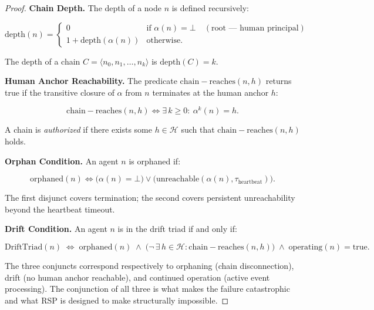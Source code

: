 \begin{proof}
\medskip
\noindent\textbf{Chain Depth.}
The depth of a node $n$ is defined recursively:

\begin{equation}
\mathrm{depth}(n) = 
\begin{cases}
0 & \text{if } \alpha(n) = \bot \quad (\text{root — human principal}) \\
1 + \mathrm{depth}(\alpha(n)) & \text{otherwise}.
\end{cases}
\label{eq:rs-depth}
\end{equation}

The depth of a chain $C = \langle n_0, n_1, \ldots, n_k \rangle$ is $\mathrm{depth}(C) = k$.

\medskip
\noindent\textbf{Human Anchor Reachability.}
The predicate $\mathrm{chain-reaches}(n, h)$ returns true if the transitive closure of $\alpha$ from $n$ terminates at the human anchor $h$:

\begin{equation}
\mathrm{chain-reaches}(n, h) \iff \exists\, k \geq 0:\ \alpha^{k}(n) = h.
\label{eq:rs-chain-reaches}
\end{equation}

A chain is \emph{authorized} if there exists some $h \in \mathcal{H}$ such that $\mathrm{chain-reaches}(n, h)$ holds.

\medskip
\noindent\textbf{Orphan Condition.}
An agent $n$ is orphaned if:

\begin{equation}
\mathrm{orphaned}(n) \iff \bigl( \alpha(n) = \bot \bigr) \lor \bigl( \mathrm{unreachable}(\alpha(n), \tau_{\mathrm{heartbeat}}) \bigr).
\label{eq:rs-orphaned}
\end{equation}

The first disjunct covers termination; the second covers persistent unreachability beyond the heartbeat timeout.

\medskip
\noindent\textbf{Drift Condition.}
An agent $n$ is in the drift triad if and only if:

\begin{equation}
\mathrm{DriftTriad}(n) \;\iff\; \mathrm{orphaned}(n) \;\land\; \bigl( \neg\,\exists\, h \in \mathcal{H} : \mathrm{chain-reaches}(n, h) \bigr) \;\land\; \mathrm{operating}(n) = \mathrm{true}.
\label{eq:rs-drift-condition}
\end{equation}

The three conjuncts correspond respectively to orphaning (chain disconnection), drift (no human anchor reachable), and continued operation (active event processing). The conjunction of all three is what makes the failure catastrophic and what RSP is designed to make structurally impossible.


\end{proof}
